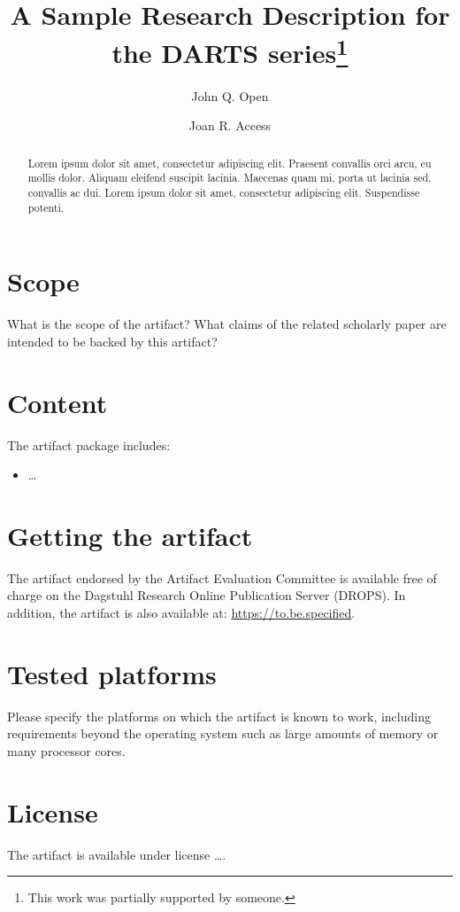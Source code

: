 \documentclass[a4paper,UKenglish]{darts-v2018}
\title{A Sample Research Description for the DARTS series\footnote{This work was partially supported by someone.}}
\author{John Q. Open}{Dummy University Computing Laboratory\\{[Address, Country]}}{johnqpublic@dummyuni.org}{[orcid]}{[funding]}%
\author{Joan R. Access}{Department of Informatics, Dummy College, Address/City, Country}{access@dummycollege.org}{yyy}{}
\newenvironment{scope}{\section{Scope}}{}
\newenvironment{content}{\section{Content}}{}
\newenvironment{getting}{\section{Getting the artifact} The artifact 
endorsed by the Artifact Evaluation Committee is available free of 
charge on the Dagstuhl Research Online Publication Server (DROPS).}{}
\newenvironment{platforms}{\section{Tested platforms}}{}
\newcommand{\license}[1]{{\section{License}#1}}
\begin{document}
\maketitle

\begin{abstract}
Lorem ipsum dolor sit amet, consectetur adipiscing elit. Praesent convallis orci arcu, eu mollis dolor. Aliquam eleifend suscipit lacinia. Maecenas quam mi, porta ut lacinia sed, convallis ac dui. Lorem ipsum dolor sit amet, consectetur adipiscing elit. Suspendisse potenti. 
 \end{abstract}


\begin{scope}
What is the scope of the artifact? What claims of the related scholarly paper are intended to be backed by this artifact?
\end{scope}

\begin{content}
The artifact package includes:
\begin{itemize}
\item \dots
\end{itemize}
\end{content}

\begin{getting}
In addition, the artifact is also available at:
\url{https://to.be.specified}.
\end{getting}

\begin{platforms}
Please specify the platforms on which the artifact is known to
work, including requirements beyond the operating system such as large
amounts of memory or many processor cores.
\end{platforms}

\license{The artifact is available under license \dots.}
\end{document}
